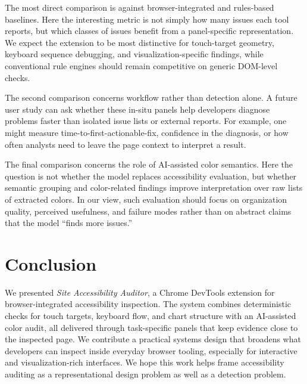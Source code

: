 The most direct comparison is against browser-integrated and rules-based baselines. Here the interesting metric is not simply how many issues each tool reports, but which classes of issues benefit from a panel-specific representation. We expect the extension to be most distinctive for touch-target geometry, keyboard sequence debugging, and visualization-specific findings, while conventional rule engines should remain competitive on generic DOM-level checks.

The second comparison concerns workflow rather than detection alone. A future user study can ask whether these in-situ panels help developers diagnose problems faster than isolated issue lists or external reports. For example, one might measure time-to-first-actionable-fix, confidence in the diagnosis, or how often analysts need to leave the page context to interpret a result.

The final comparison concerns the role of AI-assisted color semantics. Here the question is not whether the model replaces accessibility evaluation, but whether semantic grouping and color-related findings improve interpretation over raw lists of extracted colors. In our view, such evaluation should focus on organization quality, perceived usefulness, and failure modes rather than on abstract claims that the model ``finds more issues.''

\section{Conclusion}
\label{sec:conclusion}

We presented \textit{Site Accessibility Auditor}, a Chrome DevTools extension for browser-integrated accessibility inspection. The system combines deterministic checks for touch targets, keyboard flow, and chart structure with an AI-assisted color audit, all delivered through task-specific panels that keep evidence close to the inspected page. We contribute a practical systems design that broadens what developers can inspect inside everyday browser tooling, especially for interactive and visualization-rich interfaces. We hope this work helps frame accessibility auditing as a representational design problem as well as a detection problem.
